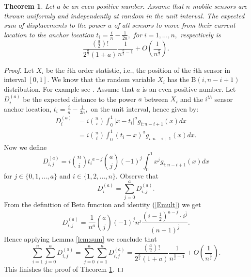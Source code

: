 \documentclass[final,5p,times,twocolumn]{elsarticle_mod}
\newcommand{\EBeta}[2]{\mathrm{B}(#1,#2)}
\newtheorem{theorem}{Theorem}
\begin{document}
\begin{theorem} 
\label{thm:mainexactodd} 
Let $a$ be an even positive number. Assume that $n$ mobile sensors are thrown uniformly and independently at random in the unit interval. The expected sum
of displacements to the power $a$ of all sensors to move from their current location to the anchor location $t_i=\frac{i}{n}-\frac{1}{2n},$
for $i=1,\dots,n,$ respectively is $$\frac{\left(\frac{a}{2}\right)!}{2^{\frac{a}{2}}(1+a)}\frac{1}{n^{\frac{a}{2}-1}}+
O\left(\frac{1}{n^{\frac{a}{2}}}\right).$$ 
\end{theorem}
\begin{proof}
Let $X_i$ be the $i$th order statistic, i.e., the position of the $i$th sensor in interval $[0,1].$
We know that the random variable $X_i$ has the $\EBeta{i}{n-i+1}$ distribution. For example see \cite{nagaraja_1992}.
Assume that $a$ is an even positive number.
Let $D^{(a)}_i$ be the expected distance to the power $a$ between $X_i$ and the $i^{th}$ sensor anchor location, $t_i=\frac{i}{n}-\frac{1}{2n},$ on the
unit interval, hence given by:
\begin{align*}
D^{(a)}_i&=i\binom{n}{i}\int_{0}^{1}|x-t_i|^ag_{i:n-i+1}(x)dx\\
&=i\binom{n}{i}\int_{0}^{1}(t_i-x)^ag_{i:n-i+1}(x)dx.
\end{align*}
Now we define
$$D^{(a)}_{i,j}=i\binom{n}{i}{t_i}^{a-j}\binom{a}{j}(-1)^j\int_{0}^{1}x^jg_{i:n-i+1}(x)dx$$
for $j\in\{0,1,\dots ,a\}$ and $i\in\{1,2,\dots ,n\}.$ Observe that
$$D^{(a)}_i=\sum_{j=0}^{a}D^{(a)}_{i,j}.$$
From the definition of Beta function and identity (\ref{Emult}) we get
$$
        D^{(a)}_{i,j}=\frac{1}{n^a}\binom{a}{j}(-1)^j n^j  \frac{ \left(i-\frac{1}{2}\right)^{a-j}\cdot i^{\overline{j}}}{(n+1)^{\overline{j}}}.
$$
Hence applying Lemma \ref{lem:sum} we conclude that
$$\sum_{i=1}^{n} \sum_{j=0}^{a} D^{(a)}_{i,j}=\sum_{j=0}^{a}\sum_{i=1}^{n} D^{(a)}_{i,j}=\frac{\left(\frac{a}{2}\right)!}{2^{\frac{a}{2}}(1+a)}\frac{1}{n^{\frac{a}{2}-1}}+
O\left(\frac{1}{n^{\frac{a}{2}}}\right).$$
This finishes the proof of Theorem \ref{thm:mainexactodd}. 
\end{proof}
\end{document}
